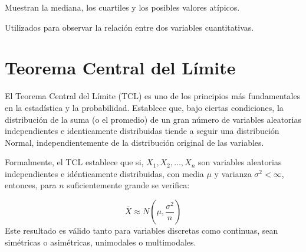 \documentclass[
  letterpaper,
  DIV=11,
  numbers=noendperiod]{scrreprt}
\begin{document}
\begin{tcolorbox}[enhanced jigsaw, arc=.35mm, breakable, coltitle=black, left=2mm, opacityback=0, bottomtitle=1mm, colbacktitle=quarto-callout-note-color!10!white, title=\textcolor{quarto-callout-note-color}{\faInfo}\hspace{0.5em}{Gráficos de caja (boxplots)}, titlerule=0mm, colback=white, colframe=quarto-callout-note-color-frame, bottomrule=.15mm, rightrule=.15mm, opacitybacktitle=0.6, toptitle=1mm, toprule=.15mm, leftrule=.75mm]

Muestran la mediana, los cuartiles y los posibles valores atípicos.

\end{tcolorbox}

\begin{tcolorbox}[enhanced jigsaw, arc=.35mm, breakable, coltitle=black, left=2mm, opacityback=0, bottomtitle=1mm, colbacktitle=quarto-callout-note-color!10!white, title=\textcolor{quarto-callout-note-color}{\faInfo}\hspace{0.5em}{Gráficos de dispersión (scatterplots)}, titlerule=0mm, colback=white, colframe=quarto-callout-note-color-frame, bottomrule=.15mm, rightrule=.15mm, opacitybacktitle=0.6, toptitle=1mm, toprule=.15mm, leftrule=.75mm]

Utilizados para observar la relación entre dos variables cuantitativas.

\end{tcolorbox}

\hypertarget{teorema-central-del-luxedmite}{%
\section{Teorema Central del
Límite}\label{teorema-central-del-luxedmite}}

El Teorema Central del Límite (TCL) es uno de los principios más
fundamentales en la estadística y la probabilidad. Establece que, bajo
ciertas condiciones, la distribución de la suma (o el promedio) de un
gran número de variables aleatorias independientes e identicamente
distribuidas tiende a seguir una distribución Normal, independientemente
de la distribución original de las variables.

Formalmente, el TCL establece que si, \(X_1,X_2,\ldots,X_n\) son
variables aleatorias independientes e idénticamente distribuidas, con
media \(\mu\) y varianza \(\sigma^2<\infty\), entonces, para \(n\)
suficientemente grande se verifica:

\[\bar{X} \approx N \left ( \mu,\frac{\sigma^2}{n}\right )\] Este
resultado es válido tanto para variables discretas como continuas, sean
simétricas o asimétricas, unimodales o multimodales.
\end{document}
